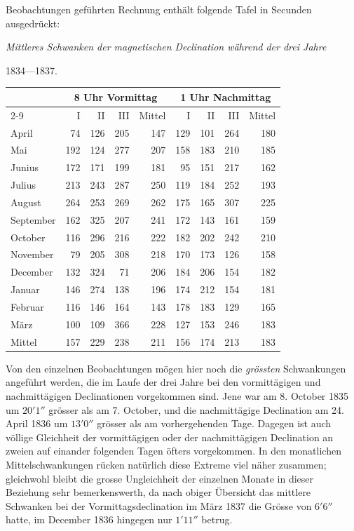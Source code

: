 \newcommand{\GaussVMagneticFolio}[3]{%
  \fancypagestyle{GaussVPrinted#1}{%
    \fancyhead{}%
    \fancyhead[C]{\small MAGNETISCHE BEOBACHTUNGEN.}%
    \fancyhead[#2]{\small #1}%
    \fancyfoot[R]{\small #3\hspace{.18\headwidth}}%
    \renewcommand{\headrulewidth}{0pt}%
  }%
  \thispagestyle{GaussVPrinted#1}%
}
Beobachtungen geführten Rechnung enthält folgende Tafel in Secunden ausgedrückt:
\begin{center}\small
\textit{Mittleres Schwanken der magnetischen Declination während der drei Jahre}\par
1834---1837.\par\smallskip
\begin{tabular}{l|r|r|r||r||r|r|r||r}
&\multicolumn{4}{c||}{8 Uhr Vormittag}&\multicolumn{4}{c}{1 Uhr Nachmittag}\\\cline{2-9}
&I&II&III&Mittel&I&II&III&Mittel\\\hline
April&74&126&205&147&129&101&264&180\\
Mai&192&124&277&207&158&183&210&185\\
Junius&172&171&199&181&95&151&217&162\\
Julius&213&243&287&250&119&184&252&193\\
August&264&253&269&262&175&165&307&225\\
September&162&325&207&241&172&143&161&159\\
October&116&296&216&222&182&202&242&210\\
November&79&205&308&218&170&173&126&158\\
December&132&324&71&206&184&206&154&182\\
Januar&146&274&138&196&174&212&154&181\\
Februar&116&146&164&143&178&183&129&165\\
März&100&109&366&228&127&153&246&183\\\hline
Mittel&157&229&238&211&156&174&213&183
\end{tabular}
\end{center}

Von den einzelnen Beobachtungen mögen hier noch die \textit{grössten} Schwan\-kungen angeführt werden, die im Laufe der drei Jahre bei den vormittägigen und nachmittägigen Declinationen vorgekommen sind. Jene war am 8. October 1835 um $20'1''$ grösser als am 7. October, und die nachmittägige Declination am 24. April 1836 um $13'0''$ grösser als am vorhergehenden Tage. Dagegen ist auch völlige Gleichheit der vormittägigen oder der nachmittägigen Declination an zweien auf einander folgenden Tagen öfters vorgekommen. In den monatlichen Mittelschwankungen rücken natürlich diese Extreme viel näher zusammen; gleichwohl bleibt die grosse Ungleichheit der einzelnen Monate in dieser Beziehung sehr bemerkenswerth, da nach obiger Übersicht das mittlere Schwanken bei der Vormittagsdeclination im März 1837 die Grösse von $6'6''$ hatte, im December 1836 hingegen nur $1'11''$ betrug.

